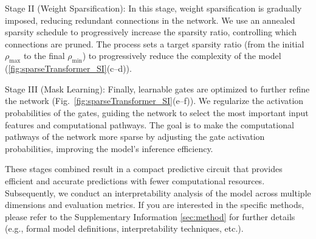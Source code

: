 Stage II (Weight Sparsification): In this stage, weight sparsification is gradually imposed, reducing redundant connections in the network. We use an annealed sparsity schedule to progressively increase the sparsity ratio, controlling which connections are pruned\cite{zhu2017prunepruneexploringefficacy}. The process sets a target sparsity ratio (from the initial $\rho_{\max}$ to the final $\rho_{\min}$) to progressively reduce the complexity of the model (\ref{fig:sparseTransformer_SI}(c--d)).

Stage III (Mask Learning): Finally, learnable gates are optimized to further refine the network (Fig.~\ref{fig:sparseTransformer_SI}(e--f)). We regularize the activation probabilities of the gates, guiding the network to select the most important input features and computational pathways\cite{NEURIPS2019_1113d7a7}. The goal is to make the computational pathways of the network more sparse by adjusting the gate activation probabilities, improving the model's inference efficiency.

These stages combined result in a compact predictive circuit that provides efficient and accurate predictions with fewer computational resources\cite{openai_weight_sparse_transformers}. Subsequently, we conduct an interpretability analysis of the model across multiple dimensions and evaluation metrics. If you are interested in the specific methods, please refer to the Supplementary Information \ref{sec:method} for further details (e.g., formal model definitions, interpretability techniques, etc.).